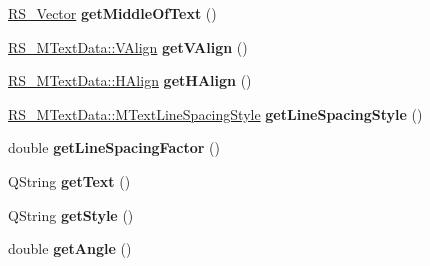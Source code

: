 \begin{DoxyCompactItemize}
\item 
\hypertarget{classRS__Dimension_a50eafa6c5e707ba8c34e944f0d13ea15}{\hyperlink{classRS__Vector}{R\-S\-\_\-\-Vector} {\bfseries get\-Middle\-Of\-Text} ()}\label{classRS__Dimension_a50eafa6c5e707ba8c34e944f0d13ea15}

\item 
\hypertarget{classRS__Dimension_adcbab5f689e51512922eaed8770de4c8}{\hyperlink{classRS__MTextData_a9f1c092c22fc207e48e1f3f23b93d54f}{R\-S\-\_\-\-M\-Text\-Data\-::\-V\-Align} {\bfseries get\-V\-Align} ()}\label{classRS__Dimension_adcbab5f689e51512922eaed8770de4c8}

\item 
\hypertarget{classRS__Dimension_ac59f043cc50fd95e7cab43e5107d72c0}{\hyperlink{classRS__MTextData_ad819fe18c56a345fcfb205705c0445cc}{R\-S\-\_\-\-M\-Text\-Data\-::\-H\-Align} {\bfseries get\-H\-Align} ()}\label{classRS__Dimension_ac59f043cc50fd95e7cab43e5107d72c0}

\item 
\hypertarget{classRS__Dimension_a345586aa43ab630ef9f67226454b5c7f}{\hyperlink{classRS__MTextData_ada9028cb480af4b0365164c6edd4a3ad}{R\-S\-\_\-\-M\-Text\-Data\-::\-M\-Text\-Line\-Spacing\-Style} {\bfseries get\-Line\-Spacing\-Style} ()}\label{classRS__Dimension_a345586aa43ab630ef9f67226454b5c7f}

\item 
\hypertarget{classRS__Dimension_ab5cc4d60df2a07958676e52a7c55948f}{double {\bfseries get\-Line\-Spacing\-Factor} ()}\label{classRS__Dimension_ab5cc4d60df2a07958676e52a7c55948f}

\item 
\hypertarget{classRS__Dimension_add997569ca6d14045175d240a4e0923f}{Q\-String {\bfseries get\-Text} ()}\label{classRS__Dimension_add997569ca6d14045175d240a4e0923f}

\item 
\hypertarget{classRS__Dimension_a3e990e6bbdea76b2f8fe77ad5488ff58}{Q\-String {\bfseries get\-Style} ()}\label{classRS__Dimension_a3e990e6bbdea76b2f8fe77ad5488ff58}

\item 
\hypertarget{classRS__Dimension_aa8ba0190123a5b00bdf2da7785df69ef}{double {\bfseries get\-Angle} ()}\label{classRS__Dimension_aa8ba0190123a5b00bdf2da7785df69ef}


\end{DoxyCompactItemize}
